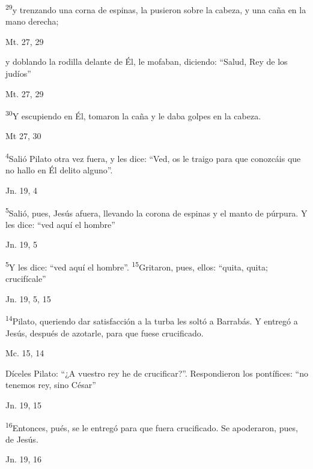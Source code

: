 \documentclass[a4paper,11pt]{article}
\begin{document}
      \textsuperscript{29}y trenzando una corna de espinas, la pusieron sobre la cabeza, y una caña en la mano derecha; 
      \begin{center}
        Mt. 27, 29
      \end{center}

      y doblando la rodilla delante de Él, le mofaban, diciendo: ``Salud, Rey de los judíos''
      \begin{center}
        Mt. 27, 29
      \end{center}

      \textsuperscript{30}Y escupiendo en Él, tomaron la caña y le daba golpes en la cabeza.
      \begin{center}
        Mt 27, 30
      \end{center}

      \textsuperscript{4}Salió Pilato otra vez fuera, y les dice: ``Ved, os le traigo para que conozcáis que no hallo en Él delito alguno''.
      \begin{center}
        Jn. 19, 4
      \end{center}

      \textsuperscript{5}Salió, pues, Jesús afuera, llevando la corona de espinas y el manto de púrpura. Y les dice: ``ved aquí el hombre''
      \begin{center}
        Jn. 19, 5
      \end{center}

      \textsuperscript{5}Y les dice: ``ved aquí el hombre''. \textsuperscript{15}Gritaron, pues, ellos: ``quita, quita; crucifícale''
      \begin{center}
        Jn. 19, 5, 15
      \end{center}

      \textsuperscript{14}Pilato, queriendo dar satisfacción a la turba les soltó a Barrabás. Y entregó a Jesús, después de azotarle, para que fuese crucificado.
      \begin{center}
        Mc. 15, 14
      \end{center}

      Díceles Pilato: ``¿A vuestro rey he de crucificar?''. Respondieron los pontífices: ``no tenemos rey, sino César''
      \begin{center}
        Jn. 19, 15
      \end{center}

      \textsuperscript{16}Entonces, pués, se le entregó para que fuera crucificado. Se apoderaron, pues, de Jesús.
      \begin{center}
        Jn. 19, 16
      \end{center}
\end{document}
